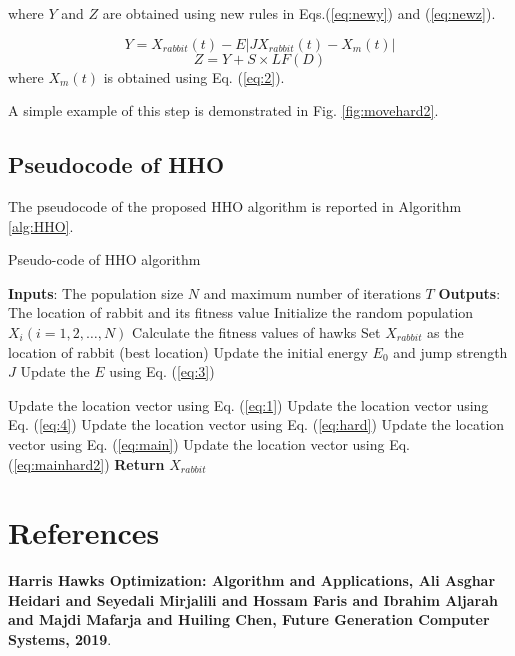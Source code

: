 \documentclass[preprint,12pt]{elsarticle}
\begin{document}
where $Y$ and $Z$ are obtained using new rules in Eqs.(\ref{eq:newy}) and (\ref{eq:newz}).

\begin{equation} \label{eq:newy}
Y=X_{rabbit}(t)-E\left |JX_{rabbit}(t)-X_{m}(t)\right |
\end{equation}
\begin{equation} \label{eq:newz}
Z=Y+S\times LF(D)
\end{equation}
where $X_{m}(t)$ is obtained using Eq. (\ref{eq:2}).

A simple example of this step is demonstrated in Fig. \ref{fig:movehard2}.


\subsection{Pseudocode of HHO}
The pseudocode of the proposed HHO algorithm is reported in Algorithm \ref{alg:HHO}.

\begin{algorithm}

\caption{Pseudo-code of HHO algorithm}\label{alg:HHO}
\begin{algorithmic}
\State \textbf{Inputs}: The population size $N$ and maximum number of iterations $T$
\State \textbf{Outputs}: The location of rabbit and its fitness value
\State Initialize the random population $X_{i}(i=1,2,\ldots,N)$
\State Calculate the fitness values of hawks
\State Set \textbf{$X_{rabbit}$} as the location of rabbit (best location)
\State Update the initial energy $E_{0}$ and jump strength $J$ 
\State Update the $E$ using Eq. (\ref{eq:3})

 
\State Update the location vector using Eq. (\ref{eq:1})
\EndIf
{} 
  
\State Update the location vector using Eq. (\ref{eq:4})
{} 
\State Update the location vector using Eq. (\ref{eq:hard})
{} 
\State Update the location vector using Eq. (\ref{eq:main})
{}  
\State Update the location vector using Eq. (\ref{eq:mainhard2})
\EndIf
\EndIf
\EndFor
\EndWhile
\State \textbf{Return} \textbf{$X_{rabbit}$}
\end{algorithmic}
\end{algorithm}

\section*{References}

\textbf{Harris Hawks Optimization: Algorithm and Applications, Ali Asghar Heidari and Seyedali Mirjalili and Hossam Faris and Ibrahim Aljarah and Majdi Mafarja and Huiling Chen, Future Generation Computer Systems, 2019}.
\end{document}

